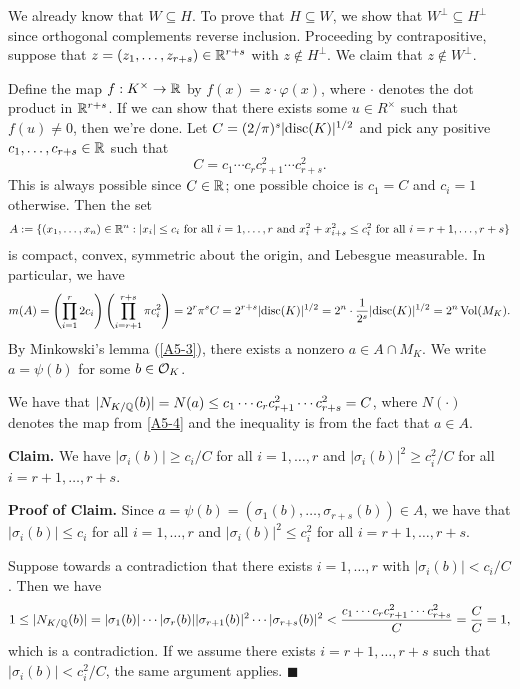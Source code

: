 \begin{pf}
    We already know that $W \subseteq H$. To prove that $H \subseteq W$, we show that 
    $W^\perp \subseteq H^\perp$ since orthogonal complements reverse 
    inclusion. Proceeding by contrapositive,
    suppose that $z = (z_1, \dots, z_{r+s}) \in \mathbb{R}^{r+s}$ 
    with $z \notin H^\perp$. We claim that $z \notin W^\perp$. 

    Define the map $f : K^\times \to \mathbb{R}$ by $f(x) = z \cdot \varphi(x)$, where $\cdot$ 
    denotes the dot product in $\mathbb{R}^{r+s}$. If we can show that 
    there exists some $u \in R^\times$ such that $f(u) \neq 0$, then we're done. 
    Let $C = (2/\pi)^s \lvert\operatorname{disc}(K)\rvert^{1/2}$ 
    and pick any positive $c_1, \dots, c_{r+s} \in \mathbb{R}$ such that 
    \[ C = c_1 \cdots c_r c_{r+1}^2 \cdots c_{r+s}^2. \] 
    This is always possible since $C \in \mathbb{R}$; one possible choice is $c_1 = C$ and 
    $c_i = 1$ otherwise. 
    Then the set 
    \[ A := \{(x_1, \dots, x_n) \in \mathbb{R}^n : |x_i| \leq c_i \text{ for all $i = 1, \dots, r$ 
    and $x_i^2 + x_{i+s}^2 \leq c_i^2$ for all $i = r+1, \dots, r+s$}\} \] 
    is compact, convex, symmetric about the origin, and Lebesgue measurable. In particular, 
    we have
    \[ m(A) = \left( \prod_{i=1}^r 2c_i \right) \left( \prod_{i=r+1}^{r+s} \pi c_i^2 \right) 
    = 2^r \pi^s C = 2^{r+s} \lvert\operatorname{disc}(K)\rvert^{1/2} = 2^n \cdot \frac1{2^s}\lvert\operatorname{disc}(K)\rvert^{1/2}
    = 2^n \operatorname{Vol}(M_K). \] 
    By Minkowski's lemma (\ref{A5-3}), there exists a nonzero $a \in A \cap M_K$. We write 
    $a = \psi(b)$ for some $b \in {\cal O}_K$. 

    We have that $|N_{K/\mathbb{Q}}(b)| = N(a) \leq c_1 \cdots c_r c_{r+1}^2 
    \cdots c_{r+s}^2 = C$, where $N(\cdot)$ denotes the map from \ref{A5-4} and 
    the inequality is from the fact that $a \in A$.

    {\bf Claim.} We have $|\sigma_i(b)| \geq c_i/C$ for all $i = 1, \dots, r$
    and $|\sigma_i(b)|^2 \geq c_i^2/C$ for all $i = r+1, \dots, r+s$.

    {\bf Proof of Claim.} Since $a = \psi(b) = (\sigma_1(b), \dots, \sigma_{r+s}(b)) \in A$, 
    we have that $|\sigma_i(b)| \leq c_i$ for all $i = 1, \dots, r$ and 
    $|\sigma_i(b)|^2 \leq c_i^2$ for all $i = r+1, \dots, r+s$. 

    Suppose towards a contradiction that there exists $i = 1, \dots, r$ with 
    $|\sigma_i(b)| < c_i/C$. Then we have 
    \[ 1 \leq |N_{K/\mathbb{Q}}(b)| = |\sigma_1(b)| \cdots |\sigma_r(b)| |\sigma_{r+1}(b)|^2 
    \cdots |\sigma_{r+s}(b)|^2 < \frac{c_1 \cdots c_r c_{r+1}^2 \cdots c_{r+s}^2}{C} 
    = \frac{C}{C} = 1, \] 
    which is a contradiction. If we assume there exists $i = r+1, \dots, r+s$ 
    such that $|\sigma_i(b)| < c_i^2/C$, the same argument applies. \hfill $\blacksquare$ 


\end{pf}
